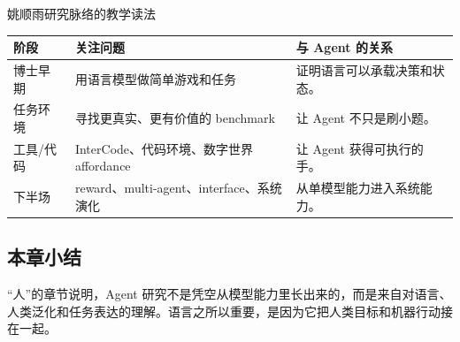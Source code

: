 \begin{knowledgebox}{姚顺雨研究脉络的教学读法}
\begin{tabularx}{\textwidth}{p{}p{}X}
\toprule
阶段 & 关注问题 & 与 Agent 的关系 \\
\midrule
博士早期 & 用语言模型做简单游戏和任务 & 证明语言可以承载决策和状态。 \\
任务环境 & 寻找更真实、更有价值的 benchmark & 让 Agent 不只是刷小题。 \\
工具/代码 & InterCode、代码环境、数字世界 affordance & 让 Agent 获得可执行的手。 \\
下半场 & reward、multi-agent、interface、系统演化 & 从单模型能力进入系统能力。 \\
\bottomrule
\end{tabularx}
\end{knowledgebox}

\subsection{本章小结}

“人”的章节说明，Agent 研究不是凭空从模型能力里长出来的，而是来自对语言、人类泛化和任务表达的理解。语言之所以重要，是因为它把人类目标和机器行动接在一起。

